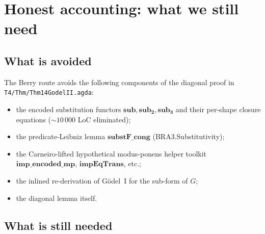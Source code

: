 \documentclass[11pt]{article}
\theoremstyle{plain}
\theoremstyle{definition}
\theoremstyle{remark}
\begin{document}
\section{Honest accounting: what we still need}

\subsection{What is avoided}

The Berry route avoids the following components of the diagonal proof
in \verb|T4/Thm/Thm14GodelII.agda|:
\begin{itemize}
\item the encoded substitution functors $\mathbf{sub}, \mathbf{sub_2},
\mathbf{sub_3}$ and their per-shape closure equations
($\sim 10\,000$ LoC eliminated);
\item the predicate-Leibniz lemma $\mathbf{substF\_cong}$
(BRA3.Substitutivity);
\item the Carneiro-lifted hypothetical modus-ponens helper toolkit
$\mathbf{imp\_encoded\_mp}$, $\mathbf{impEqTrans}$, etc.;
\item the inlined re-derivation of G\"odel~I for the sub-form of $G$;
\item the diagonal lemma itself.
\end{itemize}

\subsection{What is still needed}
\end{document}

